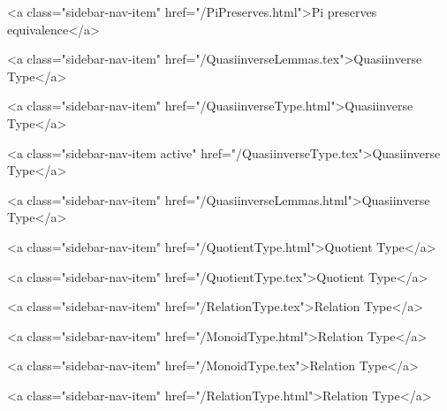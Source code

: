           <a class="sidebar-nav-item" href="/PiPreserves.html">Pi preserves equivalence</a>
        
      
    
      
        
          <a class="sidebar-nav-item" href="/QuasiinverseLemmas.tex">Quasiinverse Type</a>
        
      
    
      
        
          <a class="sidebar-nav-item" href="/QuasiinverseType.html">Quasiinverse Type</a>
        
      
    
      
        
          <a class="sidebar-nav-item active" href="/QuasiinverseType.tex">Quasiinverse Type</a>
        
      
    
      
        
          <a class="sidebar-nav-item" href="/QuasiinverseLemmas.html">Quasiinverse Type</a>
        
      
    
      
        
          <a class="sidebar-nav-item" href="/QuotientType.html">Quotient Type</a>
        
      
    
      
        
          <a class="sidebar-nav-item" href="/QuotientType.tex">Quotient Type</a>
        
      
    
      
        
          <a class="sidebar-nav-item" href="/RelationType.tex">Relation Type</a>
        
      
    
      
        
          <a class="sidebar-nav-item" href="/MonoidType.html">Relation Type</a>
        
      
    
      
        
          <a class="sidebar-nav-item" href="/MonoidType.tex">Relation Type</a>
        
      
    
      
        
          <a class="sidebar-nav-item" href="/RelationType.html">Relation Type</a>
        
      
    
